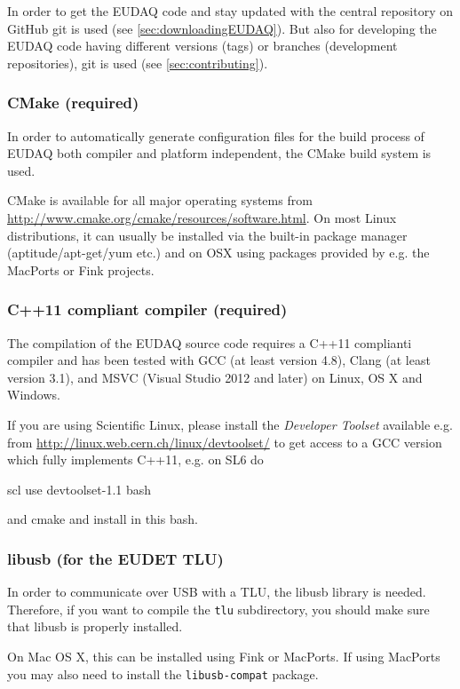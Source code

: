 In order to get the EUDAQ code and stay updated with the central repository on GitHub git is used (see \autoref{sec:downloadingEUDAQ}).
But also for developing the EUDAQ code having different versions (tags) or branches (development repositories), git is used (see \autoref{sec:contributing}).


\subsubsection{CMake (required)}
In order to automatically generate configuration files for the build process of EUDAQ both compiler and platform independent, the CMake build system is used.

CMake is available for all major operating systems from \url{http://www.cmake.org/cmake/resources/software.html}. On most Linux distributions, it can usually be installed via the built-in package manager (aptitude/apt-get/yum etc.) and on OSX using packages provided by e.g. the MacPorts or Fink projects.

\subsubsection{C++11 compliant compiler (required)}
The compilation of the EUDAQ source code requires a C++11 complianti compiler and has been tested with GCC (at least version 4.8), Clang (at least version 3.1), and MSVC (Visual Studio 2012 and later) on Linux, OS X and Windows.

If you are using Scientific Linux, please install the \emph{Developer Toolset} available e.g. from \url{http://linux.web.cern.ch/linux/devtoolset/} to get access to a GCC version which fully implements C++11, e.g. on SL6 do
\begin{listing}[mybash]
scl use devtoolset-1.1 bash
\end{listing}
and cmake and install in this bash.

\subsubsection{libusb (for the EUDET TLU)}
In order to communicate over USB with a \gls{TLU}, the libusb library is needed.
Therefore, if you want to compile the \texttt{tlu} subdirectory, you should make sure that libusb is properly installed.

On Mac OS X, this can be installed using Fink or MacPorts.
If using MacPorts you may also need to install the \texttt{libusb-compat} package.

